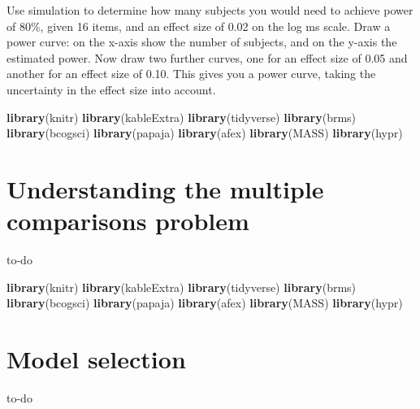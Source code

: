 \documentclass[12pt,]{krantz}
\newenvironment{Shaded}{\begin{snugshade}}{\end{snugshade}}
\newcommand{\KeywordTok}[1]{\textcolor[rgb]{0.13,0.29,0.53}{\textbf{#1}}}
\newcommand{\NormalTok}[1]{#1}
\begin{document}
Use simulation to determine how many subjects you would need to achieve power of 80\%, given 16 items, and an effect size of 0.02 on the log ms scale. Draw a power curve: on the x-axis show the number of subjects, and on the y-axis the estimated power. Now draw two further curves, one for an effect size of 0.05 and another for an effect size of 0.10. This gives you a power curve, taking the uncertainty in the effect size into account.

\begin{Shaded}
\begin{Highlighting}[]
\KeywordTok{library}\NormalTok{(knitr)}
\KeywordTok{library}\NormalTok{(kableExtra)}
\KeywordTok{library}\NormalTok{(tidyverse)}
\KeywordTok{library}\NormalTok{(brms)}
\KeywordTok{library}\NormalTok{(bcogsci)}
\KeywordTok{library}\NormalTok{(papaja)}
\KeywordTok{library}\NormalTok{(afex)}
\KeywordTok{library}\NormalTok{(MASS)}
\KeywordTok{library}\NormalTok{(hypr)}
\end{Highlighting}
\end{Shaded}

\hypertarget{ch:multcomp}{%
\chapter{Understanding the multiple comparisons problem}\label{ch:multcomp}}

to-do

\begin{Shaded}
\begin{Highlighting}[]
\KeywordTok{library}\NormalTok{(knitr)}
\KeywordTok{library}\NormalTok{(kableExtra)}
\KeywordTok{library}\NormalTok{(tidyverse)}
\KeywordTok{library}\NormalTok{(brms)}
\KeywordTok{library}\NormalTok{(bcogsci)}
\KeywordTok{library}\NormalTok{(papaja)}
\KeywordTok{library}\NormalTok{(afex)}
\KeywordTok{library}\NormalTok{(MASS)}
\KeywordTok{library}\NormalTok{(hypr)}
\end{Highlighting}
\end{Shaded}

\hypertarget{ch:modelselection}{%
\chapter{Model selection}\label{ch:modelselection}}

to-do



\backmatter
\printindex
\end{document}
